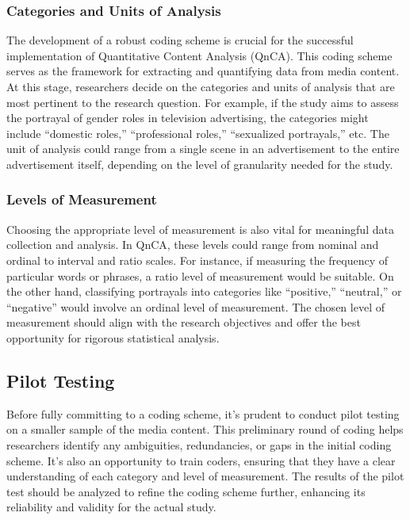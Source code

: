 \documentclass[
  b5paper]{book}
\begin{document}
\hypertarget{categories-and-units-of-analysis}{%
\subsubsection*{Categories and Units of Analysis}\label{categories-and-units-of-analysis}}

The development of a robust coding scheme is crucial for the successful implementation of Quantitative Content Analysis (QnCA). This coding scheme serves as the framework for extracting and quantifying data from media content. At this stage, researchers decide on the categories and units of analysis that are most pertinent to the research question. For example, if the study aims to assess the portrayal of gender roles in television advertising, the categories might include ``domestic roles,'' ``professional roles,'' ``sexualized portrayals,'' etc. The unit of analysis could range from a single scene in an advertisement to the entire advertisement itself, depending on the level of granularity needed for the study.

\hypertarget{levels-of-measurement}{%
\subsubsection*{Levels of Measurement}\label{levels-of-measurement}}

Choosing the appropriate level of measurement is also vital for meaningful data collection and analysis. In QnCA, these levels could range from nominal and ordinal to interval and ratio scales. For instance, if measuring the frequency of particular words or phrases, a ratio level of measurement would be suitable. On the other hand, classifying portrayals into categories like ``positive,'' ``neutral,'' or ``negative'' would involve an ordinal level of measurement. The chosen level of measurement should align with the research objectives and offer the best opportunity for rigorous statistical analysis.

\hypertarget{pilot-testing}{%
\subsection{Pilot Testing}\label{pilot-testing}}

Before fully committing to a coding scheme, it's prudent to conduct pilot testing on a smaller sample of the media content. This preliminary round of coding helps researchers identify any ambiguities, redundancies, or gaps in the initial coding scheme. It's also an opportunity to train coders, ensuring that they have a clear understanding of each category and level of measurement. The results of the pilot test should be analyzed to refine the coding scheme further, enhancing its reliability and validity for the actual study.
\end{document}
